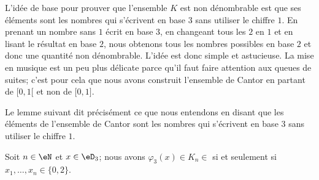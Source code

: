 \begin{normaltext}
    L'idée de base pour prouver que l'ensemble \( K\) est non dénombrable est que ses éléments sont les nombres qui s'écrivent en base \( 3\) sans utiliser le chiffre \( 1\). En prenant un nombre sans \( 1\) écrit en base \( 3\), en changeant tous les \( 2\) en \( 1\) et en lisant le résultat en base \( 2\), nous obtenons tous les nombres possibles en base \( 2\) et donc une quantité non dénombrable. L'idée est donc simple et astucieuse. La mise en musique est un peu plus délicate parce qu'il faut faire attention aux queues de suites; c'est pour cela que nous avons construit l'ensemble de Cantor en partant de \( \mathopen[ 0 , 1 [\) et non de \( \mathopen[ 0 , 1 \mathclose]\).
\end{normaltext}

Le lemme suivant dit précisément ce que nous entendons en disant que les éléments de l'ensemble de Cantor sont les nombres qui s'écrivent en base \( 3\) sans utiliser le chiffre \( 1\).
\begin{lemma}   \label{LemAZGoosKzEm}
    Soit \( n\in \eN\) et \( x\in \eD_3\); nous avons \( \varphi_3(x)\in K_n\in\) si et seulement si \( x_1,\ldots, x_n\in\{ 0,2 \}\).
\end{lemma}


